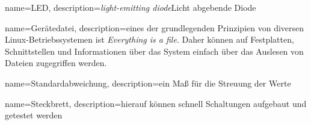 {
  name=LED,
  description={\emph{light-emitting diode}\newline Licht abgebende Diode}
}

{
  name=Gerätedatei,
  description={eines der grundlegenden Prinzipien von diversen Linux-Betriebssystemen ist \emph{Everything is a file}.\newline
  Daher können auf Festplatten, Schnittstellen und Informationen über das System einfach über das Auslesen von Dateien zugegriffen werden.
  }
}

{
  name=Standardabweichung,
  description={ein Maß für die Streuung der Werte}
}

{
  name=Steckbrett,
  description={hierauf können schnell Schaltungen aufgebaut und getestet werden}
}